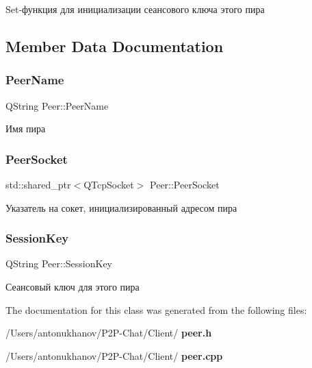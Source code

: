 Set-\/функция для инициализации сеансового ключа этого пира 



\subsection{Member Data Documentation}
\mbox{\label{class_peer_a1b31ac7becfb809b03d1926bf5507f6f}} 
\subsubsection{Peer\+Name}
{\footnotesize\ttfamily Q\+String Peer\+::\+Peer\+Name}



Имя пира 

\mbox{\label{class_peer_aaf19f96ad1374f7381ed51baa7f00b77}} 
\subsubsection{Peer\+Socket}
{\footnotesize\ttfamily std\+::shared\+\_\+ptr$<$Q\+Tcp\+Socket$>$ Peer\+::\+Peer\+Socket}



Указатель на сокет, инициализированный адресом пира 

\mbox{\label{class_peer_a6d280927dbdbc71827fa03cea40b78a5}} 
\subsubsection{Session\+Key}
{\footnotesize\ttfamily Q\+String Peer\+::\+Session\+Key}



Сеансовый ключ для этого пира 



The documentation for this class was generated from the following files\+:\begin{DoxyCompactItemize}
\item 
/\+Users/antonukhanov/\+P2\+P-\/\+Chat/\+Client/\textbf{ peer.\+h}\item 
/\+Users/antonukhanov/\+P2\+P-\/\+Chat/\+Client/\textbf{ peer.\+cpp}\end{DoxyCompactItemize}
